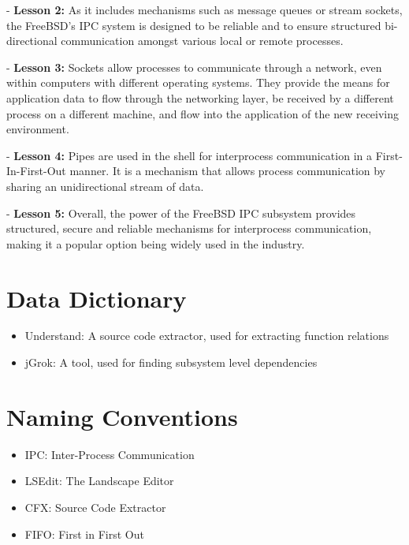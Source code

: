 \documentclass[12pt, dvipsnames, a4paper]{article}
\begin{document}
- \textbf{Lesson 2:} As it includes mechanisms such as message queues or stream sockets, the FreeBSD’s IPC system is designed to be reliable and to ensure structured bi-directional communication amongst various local or remote processes.

- \textbf{Lesson 3:} Sockets allow processes to communicate through a network, even within computers with different operating systems. They provide the means for application data to flow through the networking layer, be received by a different process on a different machine, and flow into the application of the new receiving environment.

- \textbf{Lesson 4:} Pipes are used in the shell for interprocess communication in a First-In-First-Out manner. It is a mechanism that allows process communication by sharing an unidirectional stream of data.

- \textbf{Lesson 5:} Overall, the power of the FreeBSD IPC subsystem provides structured, secure and reliable mechanisms for interprocess communication, making it a popular option being widely used in the industry.
\clearpage

\section{Data Dictionary}
\begin{itemize}
	\item{Understand: A source code extractor, used for extracting function relations}
	\item {jGrok: A tool, used for finding subsystem level dependencies}
\end{itemize}

\section{Naming Conventions}
\begin{itemize}
	\item {IPC: Inter-Process Communication}
	      \item{LSEdit: The Landscape Editor}
	\item {CFX: Source Code Extractor}
	\item {FIFO: First in First Out}
\end{itemize}
\end{document}
